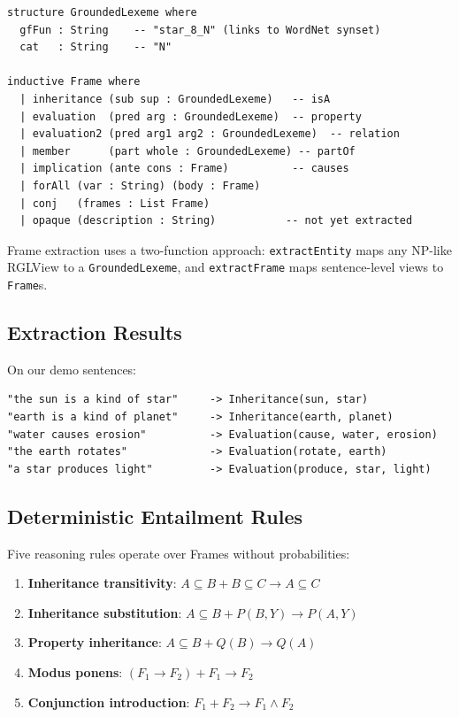 \documentclass[]{article}
\newcommand{\code}[1]{\texttt{#1}}
\begin{document}
\begin{lstlisting}[language={}]
structure GroundedLexeme where
  gfFun : String    -- "star_8_N" (links to WordNet synset)
  cat   : String    -- "N"

inductive Frame where
  | inheritance (sub sup : GroundedLexeme)   -- isA
  | evaluation  (pred arg : GroundedLexeme)  -- property
  | evaluation2 (pred arg1 arg2 : GroundedLexeme)  -- relation
  | member      (part whole : GroundedLexeme) -- partOf
  | implication (ante cons : Frame)          -- causes
  | forAll (var : String) (body : Frame)
  | conj   (frames : List Frame)
  | opaque (description : String)           -- not yet extracted
\end{lstlisting}

Frame extraction uses a two-function approach:
\code{extractEntity} maps any NP-like RGLView to a \code{GroundedLexeme},
and \code{extractFrame} maps sentence-level views to \code{Frame}s.

\subsection{Extraction Results}

On our demo sentences:

\begin{lstlisting}
"the sun is a kind of star"     -> Inheritance(sun, star)
"earth is a kind of planet"     -> Inheritance(earth, planet)
"water causes erosion"          -> Evaluation(cause, water, erosion)
"the earth rotates"             -> Evaluation(rotate, earth)
"a star produces light"         -> Evaluation(produce, star, light)
\end{lstlisting}

\subsection{Deterministic Entailment Rules}

Five reasoning rules operate over Frames without probabilities:

\begin{enumerate}
\item \textbf{Inheritance transitivity}: $A \subseteq B + B \subseteq C \to A \subseteq C$
\item \textbf{Inheritance substitution}: $A \subseteq B + P(B,Y) \to P(A,Y)$
\item \textbf{Property inheritance}: $A \subseteq B + Q(B) \to Q(A)$
\item \textbf{Modus ponens}: $(F_1 \to F_2) + F_1 \to F_2$
\item \textbf{Conjunction introduction}: $F_1 + F_2 \to F_1 \wedge F_2$
\end{enumerate}
\end{document}
